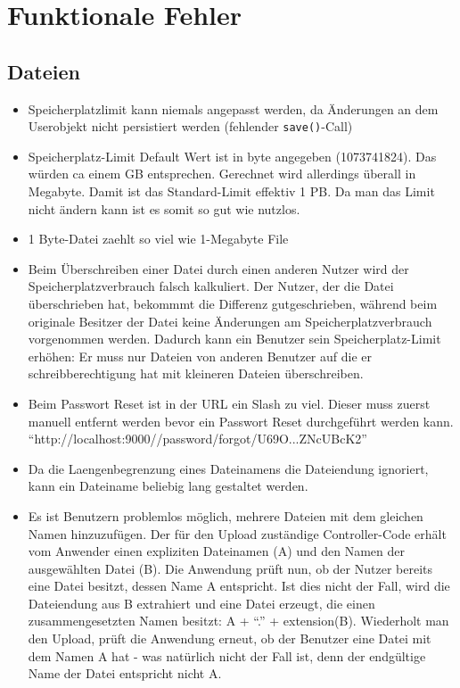 \documentclass[12pt,DIV14,BCOR10mm,a4paper,parskip=half-,headsepline,headinclude,english,ngerman,bibliography=totocnumbered]{scrreprt}
\begin{document}
\chapter{Funktionale Fehler}


\section{Dateien}

\begin{itemize}
 \item Speicherplatzlimit kann niemals angepasst werden, da Änderungen an dem Userobjekt nicht persistiert werden (fehlender \texttt{save()}-Call)
  \item Speicherplatz-Limit Default Wert ist in byte angegeben (1073741824). Das würden ca einem GB entsprechen. Gerechnet wird allerdings überall in Megabyte. Damit ist das Standard-Limit effektiv 1 PB. Da man das Limit nicht ändern kann ist es somit so gut wie nutzlos.
  \item 1 Byte-Datei zaehlt so viel wie 1-Megabyte File
  \item Beim Überschreiben einer Datei durch einen anderen Nutzer wird der Speicherplatzverbrauch falsch kalkuliert. Der Nutzer, der die Datei überschrieben hat, bekommmt die Differenz gutgeschrieben, während beim originale Besitzer der Datei keine Änderungen am Speicherplatzverbrauch vorgenommen werden. Dadurch kann ein Benutzer sein Speicherplatz-Limit erhöhen: Er muss nur Dateien von anderen Benutzer auf die er schreibberechtigung hat mit kleineren Dateien überschreiben.
  \item Beim Passwort Reset ist in der URL ein Slash zu viel. Dieser muss zuerst manuell entfernt werden bevor ein Passwort Reset durchgeführt werden kann. \enquote{http://localhost:9000//password/forgot/U69O...ZNcUBcK2}
  \item Da die Laengenbegrenzung eines Dateinamens die Dateiendung ignoriert, kann ein Dateiname beliebig lang gestaltet werden.
  \item Es ist Benutzern problemlos möglich, mehrere Dateien mit dem gleichen Namen hinzuzufügen. Der für den Upload zuständige Controller-Code erhält vom Anwender einen expliziten Dateinamen (A) und den Namen der ausgewählten Datei (B). Die Anwendung prüft nun, ob der Nutzer bereits eine Datei besitzt, dessen Name A entspricht. Ist dies nicht der Fall, wird die Dateiendung aus B extrahiert und eine Datei erzeugt, die einen zusammengesetzten Namen besitzt: A + \enquote{.} + extension(B).
  Wiederholt man den Upload, prüft die Anwendung erneut, ob der Benutzer eine Datei mit dem Namen A hat - was natürlich nicht der Fall ist, denn der endgültige Name der Datei entspricht nicht A.

\end{itemize}
\end{document}
